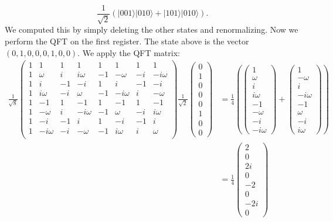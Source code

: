 \documentclass{article}
\theoremstyle{plain}
\theoremstyle{definition}
\theoremstyle{remark}
\numberwithin{theorem}{section}
\begin{document}
  \[
 \frac{1}{\sqrt{2}}\left(
 |001\rangle |010\rangle +
 |101\rangle |010\rangle \right).
 \]
 We computed this by simply deleting the other states and renormalizing.
 Now we perform the QFT on the first register.  The state above is the vector $(0,1,0,0,0,1,0,0)$.  We apply the QFT matrix:
 	\begin{align*}
					\frac{1}{\sqrt{8}}
					\begin{pmatrix}
						1 & 1 & 1 & 1 & 1 & 1 & 1 & 1 \\
						1 & \omega & i & i\omega & -1 & -\omega & -i & -i\omega \\
						1 & i & -1 & -i & 1 & i & -1 & -i \\
						1 & i\omega & -i & \omega & -1 & -i\omega & i & -\omega \\
						1 & -1 & 1 & -1 & 1 & -1 & 1 & -1 \\
						1 & -\omega & i & -i\omega & -1 & \omega & -i & i\omega \\
						1 & -i & -1 & i & 1 & -i & -1 & i \\
						1 & -i\omega & -i & -\omega & -1 & i\omega & i & \omega \\
					\end{pmatrix}
     \frac{1}{\sqrt{2}}
     \begin{pmatrix} 0 \\ 1 \\ 0 \\ 0 \\ 0 \\ 1 \\ 0 \\ 0
     \end{pmatrix}
     &=
     \frac{1}{4} \left(
     \begin{pmatrix} 1 \\ \omega \\ i \\ i\omega \\ -1 \\ -\omega \\ -i \\ -i\omega
     \end{pmatrix}
+
     \begin{pmatrix}  1 \\ -\omega \\ i \\ -i\omega \\ -1 \\ \omega \\ -i \\ i\omega
     \end{pmatrix}
     \right) \\
     &=
     \frac{1}{4}
               \begin{pmatrix} 2 \\ 0 \\ 2i \\  0 \\ -2 \\ 0 \\ -2i \\ 0
     \end{pmatrix}
					\end{align*}
\end{document}

